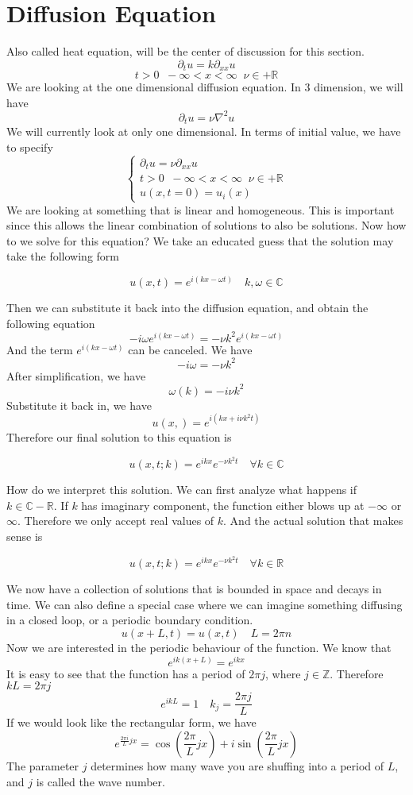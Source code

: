 \documentclass[12pt]{book}
\newcommand{\Z}{\mathbb{Z}}
\newcommand{\R}{\mathbb{R}}
\newcommand{\C}{\mathbb{C}}
\newcommand{\paren}[1]{\left( #1 \right)}
\begin{document}
\section{Diffusion Equation}
Also called heat equation, will be the center of discussion for this section.
\[
\partial_t u = k\partial_{xx}u
\]
\[
t>0\;\; -\infty < x <\infty \;\; \nu\in +\R
\]
We are looking at the one dimensional diffusion equation. In 3 dimension, we will have
\[
\partial_t u = \nu\nabla^2u
\]
We will currently look at only one dimensional. In terms of initial value, we have to specify
\[
\begin{cases}
    \partial_t u = \nu\partial_{xx}u\\
    t>0\;\; -\infty < x <\infty \;\; \nu\in +\R\\
    u(x,t=0) = u_i(x)
\end{cases}
\]
We are looking at something that is linear and homogeneous. This is important since this allows the linear combination of solutions to also be solutions. Now how to we solve for this equation? We take an educated guess that the solution may take the following form
\begin{large}
\[
u(x,t) = e^{i(kx-\omega t)} \quad k,\omega \in \C
\]
\end{large}
Then we can substitute it back into the diffusion equation, and obtain the following equation
\[
-i\omega e^{i(kx-\omega t)} = -\nu k^2 e^{i(kx-\omega t)}
\]
And the term $e^{i(kx-\omega t)}$ can be canceled. We have
\[
-i\omega = -\nu k^2
\]
After simplification, we have
\[
\omega(k) = -i\nu k^2
\]
Substitute it back in, we have
    \[
    u(x,) = e^{i(kx+i\nu k^2 t)}
    \]
Therefore our final solution to this equation is
\begin{large}
    \[
    u(x,t;k) = e^{ikx}e^{-\nu k^2 t} \quad \forall k \in \C
    \]
\end{large}
How do we interpret this solution. We can first analyze what happens if $k \in \C - \R$. If $k$ has imaginary component, the function either blows up at $-\infty$ or $\infty$. Therefore we only accept real values of $k$. And the actual solution that makes sense is
\begin{large}
    \[
    u(x,t;k) = e^{ikx}e^{-\nu k^2 t} \quad \forall k \in \R
    \]
\end{large}
We now have a collection of solutions that is bounded in space and decays in time. We can also define a special case where we can imagine something diffusing in a closed loop, or a periodic boundary condition.
\[
u(x+L,t) = u(x,t) \quad L = 2\pi n
\]
Now we are interested in the periodic behaviour of the function. We know that
\[
e^{ik(x+L)} = e^{ikx}
\]
It is easy to see that the function has a period of $2\pi j$, where $j \in \Z$. Therefore $kL = 2\pi j$
\[
e^{ikL} = 1 \quad k_j = \frac{2\pi j}{L}
\]
If we would look like the rectangular form, we have
\[
e^{\frac{2\pi i}{L}jx} = \cos\paren{\frac{2\pi}{L}jx} + i\sin\paren{\frac{2\pi}{L}jx}
\]
The parameter $j$ determines how many wave you are shuffing into a period of $L$, and $j$ is called the wave number. 
\end{document}
